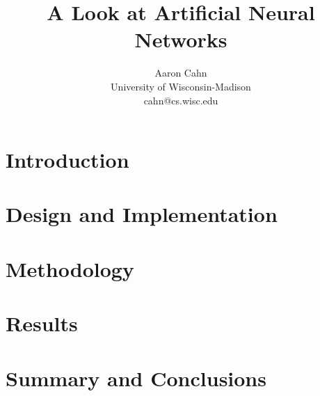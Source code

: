 \documentclass[12pt,twocolumn]{article}
\begin{document}
\title{A Look at Artificial Neural Networks}
\date{}



\author{
Aaron Cahn\\
University of Wisconsin-Madison\\
cahn@cs.wisc.edu
}


\maketitle
\begin{abstract}

\end{abstract}

\section{Introduction} \label{sec:intro} 
\section{Design and Implementation} \label{sec:design} 
\section{Methodology} \label{sec:methodology} 
\section{Results} \label{sec:results} 
\section{Summary and Conclusions} \label{sec:summary} 



\end{document}
